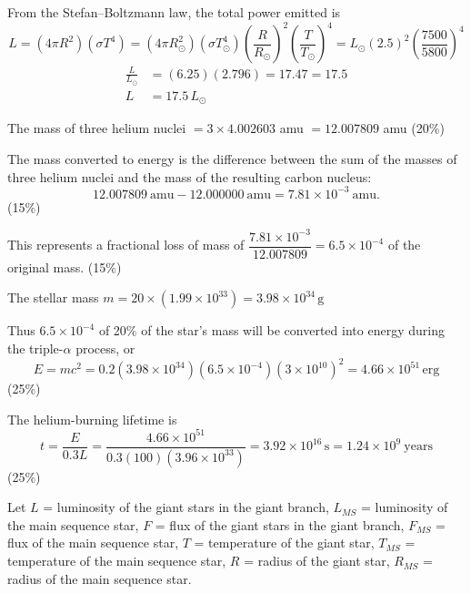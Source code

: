 From the Stefan--Boltzmann law, the total power emitted is
\[
  L = \left(4\pi R^2\right)\left(\sigma T^4\right)
    = \left(4\pi R_\odot^2\right)\left(\sigma T_\odot^4\right)
      \left(\frac{R}{R_\odot}\right)^{\!2}\left(\frac{T}{T_\odot}\right)^{\!4}
    = L_\odot \left(2.5\right)^2 \left(\frac{7500}{5800}\right)^{\!4}
\]
\begin{align*}
  \frac{L}{L_\odot} &= \left(6.25\right)\left(2.796\right) = 17.47 = 17.5 \\
  L &= 17.5\,L_\odot
\end{align*}

The mass of three helium nuclei $= 3 \times 4.002603$ amu $= 12.007809$ amu
\hfill(20\%)

The mass converted to energy is the difference between the sum of the masses of
three helium nuclei and the mass of the resulting carbon nucleus:
\[
  12.007809\ \text{amu} - 12.000000\ \text{amu} = 7.81 \times 10^{-3}\ \text{amu}.
\]
\hfill(15\%)

This represents a fractional loss of mass of
$\dfrac{7.81 \times 10^{-3}}{12.007809} = 6.5 \times 10^{-4}$ of the original
mass.
\hfill(15\%)

The stellar mass $m = 20 \times \left(1.99 \times 10^{33}\right) = 3.98 \times 10^{34}\,\mathrm{g}$

Thus $6.5 \times 10^{-4}$ of 20\% of the star's mass will be converted into
energy during the triple-$\alpha$ process, or
\[
  E = mc^2 = 0.2(3.98 \times 10^{34})(6.5 \times 10^{-4})(3 \times 10^{10})^2
    = 4.66 \times 10^{51}\,\mathrm{erg}
\]
\hfill(25\%)

The helium-burning lifetime is
\[
  t = \frac{E}{0.3L}
    = \frac{4.66 \times 10^{51}}{0.3(100)(3.96 \times 10^{33})}
    = 3.92 \times 10^{16}\,\mathrm{s} = 1.24 \times 10^{9}\ \text{years}
\]
\hfill(25\%)

Let $L$ = luminosity of the giant stars in the giant branch,
$L_{MS}$ = luminosity of the main sequence star,
$F$ = flux of the giant stars in the giant branch,
$F_{MS}$ = flux of the main sequence star,
$T$ = temperature of the giant star,
$T_{MS}$ = temperature of the main sequence star,
$R$ = radius of the giant star,
$R_{MS}$ = radius of the main sequence star.


